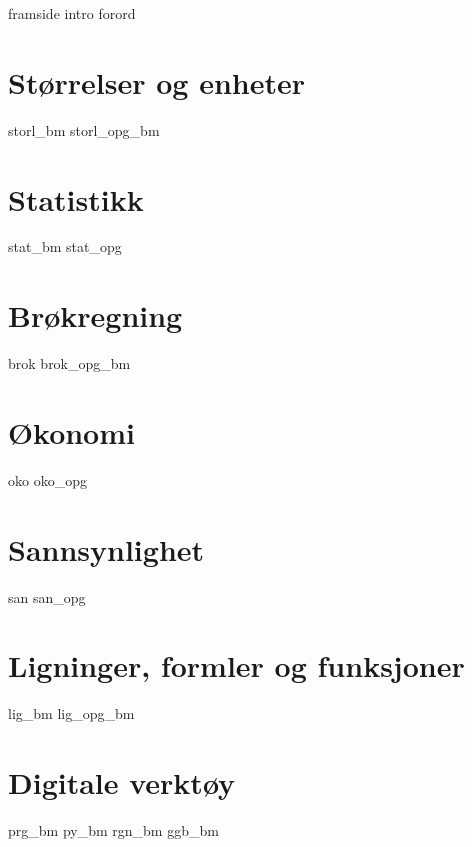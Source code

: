 



\usepackage{sansmathfonts}
\renewcommand*\familydefault{\sfdefault} %

\addto\captionsenglish{\renewcommand{\figurename}{Figur}}
\makeatletter
\addto\captionsenglish{\renewcommand{\chaptername}{Kapittel}}
\addto\captionsenglish{\renewcommand{\contentsname}{Innhold}}




{framside}
{intro}
{forord}
\newpage
\tableofcontents

\chapter{Størrelser og enheter \label{Storlogenh}}
\newpage

{storl_bm}
{storl_opg_bm}

\chapter{Statistikk \label{Statistikk}}
\newpage
{stat_bm}
{stat_opg}

\chapter{Brøkregning \label{BrokAM}}
\newpage
{brok}
\newpage
{brok_opg_bm}

\chapter{Økonomi \label{Okonomi}}
\newpage
{oko}
{oko_opg}

\chapter{Sannsynlighet \label{Sannsyn}} 
\newpage
{san}
{san_opg}

\chapter{Ligninger, formler og funksjoner \label{LigningerAM}}
\newpage
{lig_bm}
{lig_opg_bm}

\chapter{Digitale verktøy \label{Dig}}
{prg_bm}
{py_bm}
{rgn_bm}	
{ggb_bm}	


